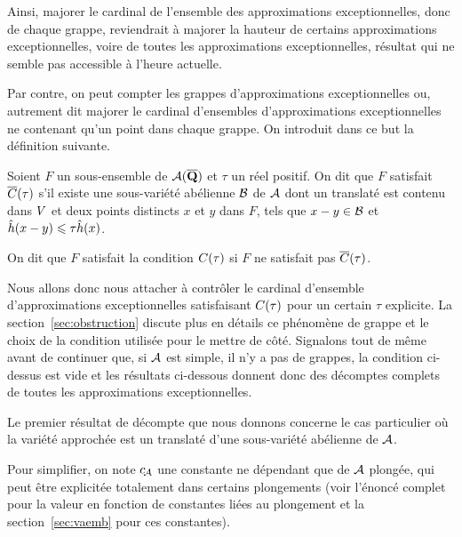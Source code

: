 Ainsi, majorer le cardinal de l'ensemble des approximations exceptionnelles,
donc de chaque grappe, reviendrait à majorer la hauteur de certains
approximations exceptionnelles, voire de toutes les approximations
exceptionnelles, résultat qui ne semble pas accessible à l'heure actuelle.

Par contre, on peut compter les grappes d'approximations exceptionnelles ou,
autrement dit majorer le cardinal d'ensembles d'approximations exceptionnelles
ne contenant qu'un point dans chaque grappe. On introduit dans ce but la
définition suivante.

\begin{tdef} \label{d:cond}
  Soient \( F \) un sous-ensemble de \( \mathcal A(\overline{{\mathbf{Q}}}) \) et \( \tau \) un réel
  positif. On dit que \( F \) satisfait \( \cond*\tau \) s'il existe une
  sous-variété abélienne \( \mathcal B \) de \( \mathcal A \) dont un translaté est contenu
  dans \( V \) et deux points distincts \( x \) et \( y \) dans \( F \),
  tels que \( x - y \in \mathcal B \) et \( \hat h ( x-y ) \leqslant \tau \hat h (x) \).

  On dit que \( F \) satisfait la condition \( \cond\tau \) si \( F \) ne
  satisfait pas \( \cond*\tau \).
\end{tdef}

Nous allons donc nous attacher à contrôler le cardinal d'ensemble
d'approximations exceptionnelles satisfaisant \( \cond\tau \) pour un certain
\( \tau \) explicite. La section~\vref{sec:obstruction} discute plus en
détails ce phénomène de grappe et le choix de la condition utilisée pour
le mettre de côté. Signalons tout de même avant de continuer que, si \( \mathcal A
\) est simple, il n'y a pas de grappes, la condition ci-dessus est vide et
les résultats ci-dessous donnent donc des décomptes complets de toutes les
approximations exceptionnelles.

\medskip

Le premier résultat de décompte que nous donnons concerne le cas particulier
où la variété approchée est un translaté d'une sous-variété abélienne de \(
  \mathcal A \).

Pour simplifier, on note \( c_{\!\mathcal A} \) une constante ne dépendant que de
\( \mathcal A \) plongée, qui peut être explicitée totalement dans certains
plongements (voir l'énoncé complet pour la valeur en fonction de constantes
liées au plongement et la section~\vref{sec:vaemb} pour ces constantes).

